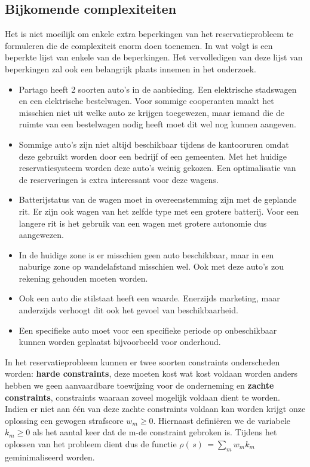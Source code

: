 \subsection{Bijkomende complexiteiten}
Het is niet moeilijk om enkele extra beperkingen van het reservatieprobleem te formuleren die de complexiteit enorm doen toenemen. In wat volgt is een beperkte lijst van enkele van de beperkingen. Het vervolledigen van deze lijst van beperkingen zal ook een belangrijk plaats innemen in het onderzoek.
\begin{itemize}
	\item Partago heeft 2 soorten auto's in de aanbieding. Een elektrische stadswagen en een elektrische bestelwagen. Voor sommige cooperanten maakt het misschien niet uit welke auto ze krijgen toegewezen, maar iemand die de ruimte van een bestelwagen nodig heeft moet dit wel nog kunnen aangeven.
	\item Sommige auto's zijn niet altijd beschikbaar tijdens de kantooruren omdat deze gebruikt worden door een bedrijf of een gemeenten. Met het huidige reservatiesysteem worden deze auto's weinig gekozen. Een optimalisatie van de reserveringen is extra interessant voor deze wagens.
	\item Batterijstatus van de wagen moet in overeenstemming zijn met de geplande rit. Er zijn ook wagen van het zelfde type met een grotere batterij. Voor een langere rit is het gebruik van een wagen met grotere autonomie dus aangewezen.
	\item In de huidige zone is er misschien geen auto beschikbaar, maar in een naburige zone op wandelafstand misschien wel. Ook met deze auto's zou rekening gehouden moeten worden.
	\item Ook een auto die stilstaat heeft een waarde. Enerzijds marketing, maar anderzijds verhoogt dit ook het gevoel van beschikbaarheid. 
	\item Een specifieke auto moet voor een specifieke periode op onbeschikbaar kunnen worden geplaatst bijvoorbeeld voor onderhoud.
\end{itemize}

In het reservatieprobleem kunnen er twee soorten constraints onderscheden worden: \textbf{harde constraints}, deze moeten kost wat kost voldaan worden anders hebben we geen aanvaardbare toewijzing voor de onderneming en \textbf{zachte constraints}, constraints waaraan zoveel mogelijk voldaan dient te worden. Indien er niet aan één van deze zachte constraints voldaan kan worden krijgt onze oplossing een gewogen strafscore $w_{m} \geq 0$. Hiernaast definiëren we de variabele $k_{m} \geq 0$ als het aantal keer dat de m-de constraint gebroken is. Tijdens het oplossen van het probleem dient dus de functie $\rho(\,s)\,=\sum\limits_{m} w_{m}k_{m}$ geminimaliseerd worden. \autocite{santos}   


